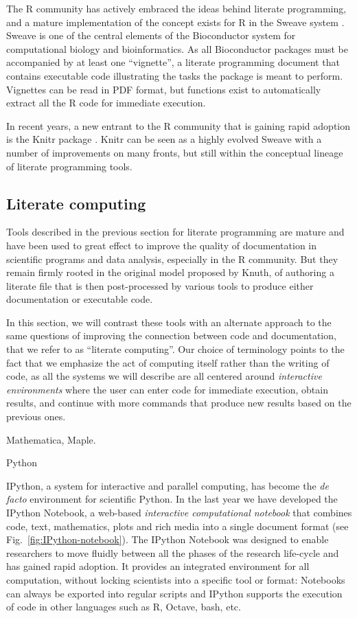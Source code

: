 \documentclass[ChapterTOCs,krantz2]{krantz} %
\begin{document}
The R community has actively embraced the ideas behind literate programming,
and a mature implementation of the concept exists for R in the Sweave system
\cite{lmucs-papers:Leisch:2002}.  Sweave is one of the central elements of the Bioconductor
system \cite{Gentleman2004, Dudoit2003} for computational biology and
bioinformatics.  As all Bioconductor packages must be accompanied by at least
one ``vignette'', a literate programming document that contains executable code
illustrating the tasks the package is meant to perform.  Vignettes can be read
in PDF format, but functions exist to automatically extract all the R code for
immediate execution.

In recent years, a new entrant to the R community that is gaining rapid
adoption is the Knitr package \cite{xie2012knitr}.  Knitr can be seen as a highly
evolved Sweave with a number of improvements on many fronts, but still within
the conceptual lineage of literate programming tools.

\subsection{Literate computing}

Tools described in the previous section for literate programming are mature
and have been used to great effect to improve the quality of documentation in
scientific programs and data analysis, especially in the R community.  But they
remain firmly rooted in the original model proposed by Knuth, of authoring a
literate file that is then post-processed by various tools to produce either
documentation or executable code.  

In this section, we will contrast these tools with an alternate approach to the
same questions of improving the connection between code and documentation, that
we refer to as ``literate computing''.  Our choice of terminology points to the
fact that we emphasize the act of computing itself rather than the writing of
code, as all the systems we will describe are all centered around
\emph{interactive environments} where the user can enter code for immediate
execution, obtain results, and continue with more commands that produce new
results based on the previous ones.

Mathematica, Maple.


Python


IPython, a system for interactive and parallel computing, has become the \emph{
  de facto} environment for scientific Python. In the last year we have
developed the IPython Notebook, a web-based \emph{ interactive computational
  notebook} that combines code, text, mathematics, plots and rich media into a
single document format (see Fig.~\ref{fig:IPython-notebook}).  The IPython
Notebook was designed to enable researchers to move fluidly between all the
phases of the research life-cycle and has gained rapid adoption. It provides an
integrated environment for all computation, without locking scientists into a
specific tool or format: Notebooks can always be exported into regular scripts
and IPython supports the execution of code in other languages such as R,
Octave, bash, etc.
\end{document}
